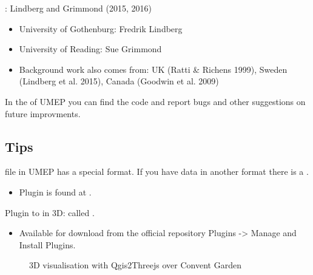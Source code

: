 \documentclass[letterpaper,10pt,english]{sphinxmanual}
\begin{document}
: Lindberg and Grimmond (2015, 2016)

\begin{itemize}
\item {} 
University of Gothenburg: Fredrik Lindberg

\item {} 
University of Reading: Sue Grimmond

\item {} 
Background work also comes from: UK (Ratti \& Richens 1999), Sweden
(Lindberg et al. 2015), Canada (Goodwin et al. 2009)

\end{itemize}

In the  of UMEP you can find the code and report bugs and other suggestions on future improvments.


\subsection{Tips}
\label{\detokenize{Tutorials/SEBE:tips}}
 file in UMEP has a special format. If you have data
in another format there is a {\hyperref[\detokenize{pre-processor/Meteorological Data MetPreprocessor:metpreprocessor}]{}}.
\begin{itemize}
\item {} 
Plugin is found at .

\end{itemize}

Plugin to  in 3D: called
.
\begin{itemize}
\item {} 
Available for download from the official repository Plugins -\textgreater{} Manage
and Install Plugins.

\end{itemize}

\begin{figure}[htbp]
\centering
\capstart

\noindent{}
\caption{3D visualisation with Qgis2Threejs over Convent Garden}\label{\detokenize{Tutorials/SEBE:id9}}\end{figure}
\end{document}
